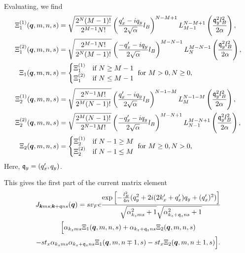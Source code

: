 Evaluating, we find
\begin{align}
  \Xi_1 ^{(1)}(\bm{q}, m, n, s) &= \sqrt{\frac{2^N (M-1)!}{2^{M-1} N!}}
                                   \left( \frac{q'_x - iq_y}{2 \sqrt{\alpha } } l_B \right)^{N-M + 1}
                                   L^{N-M+1}_{M-1} \left( \frac{\mathfrak{q}_y^2 l_B^2}{2 \alpha } \right),\\
  \Xi_1 ^{(2)}(\bm{q}, m, n, s) &= \sqrt{\frac{2^{M-1} N!}{2^N (M-1)!}}
                                   \left( \frac{-q'_x - iq_y}{2 \sqrt{\alpha } } l_B \right)^{M-N - 1}
                                   L^{M - N - 1}_N \left( \frac{\mathfrak{q}_y^2 l_B^2}{2 \alpha } \right),\\
  \Xi_1(\bm{q}, m, n, s) &=
          \begin{cases}
            \Xi _1 ^{(1)} & \text{if } N \geq M-1\\
            \Xi _1 ^{(2)} & \text{if } N \leq M-1
          \end{cases} \text{ for } M>0, N \geq 0,
\end{align}
\begin{align}
  \Xi_2 ^{(1)}(\bm{q}, m, n, s) &= \sqrt{\frac{2^{N-1} M!}{2^M (N-1)!}}
                                   \left( \frac{q'_x - iq_y}{2 \sqrt{\alpha }} l_B \right)^{N-1 - M}
                                   L^{N-1 -M}_{M} \left( \frac{\mathfrak{q}_y^2 l_B^2}{2 \alpha } \right),\\
  \Xi_2 ^{(2)}(\bm{q}, m, n, s) &= \sqrt{\frac{2^M (N-1)!}{2^{N-1} M!}}
                                   \left( \frac{-q'_x - iq_y}{2 \sqrt{\alpha }} l_B \right)^{M-N + 1}
                                   L^{M - N + 1}_{N-1} \left( \frac{\mathfrak{q}_y^2 l_B^2}{2 \alpha } \right),\\
  \Xi_2(\bm{q}, m, n, s) &=
          \begin{cases}
            \Xi _2 ^{(1)} & \text{if } N-1 \geq M\\
            \Xi _2 ^{(2)} & \text{if } N-1 \leq M
          \end{cases} \text{ for } M\geq 0, N > 0,
\end{align}
Here, \( \mathfrak{q}_y = (q'_x, q_y) \).

This gives the first part of the current matrix element
\begin{multline}
  J_{\bm{k} m s; \bm{k} + \mathfrak{q} n s} (\bm{q}) =
  s v_{F} e
  \frac{
    \exp \left[
      -\frac{l_{B}^2}{4 \alpha } (q_{y}^2 + 2i (2 k'_x + q'_x) q_{y} + (q'_x)^2 )
    \right]
  }{
    \sqrt{\alpha_{k_z m s}^2 + 1} \sqrt{ \alpha_{k_z + \mathfrak{q}_z n s}^2 + 1 }
  } \\
  \Big[
   \alpha_{k_z m s} \Xi_{1} (\bm{q}, m, n, s)
    + \alpha_{k_z + \mathfrak{q}_z n s} \Xi _{2} (\bm{q}, m, n, s)\\
    -s t_x \alpha_{k_z m s} \alpha_{k_z + \mathfrak{q}_z n s} \Xi _1(\bm{q}, m, n\mp 1, s)
    -s t_x \Xi _2(\bm{q}, m, n\pm 1, s)
  \Big].
\end{multline}


